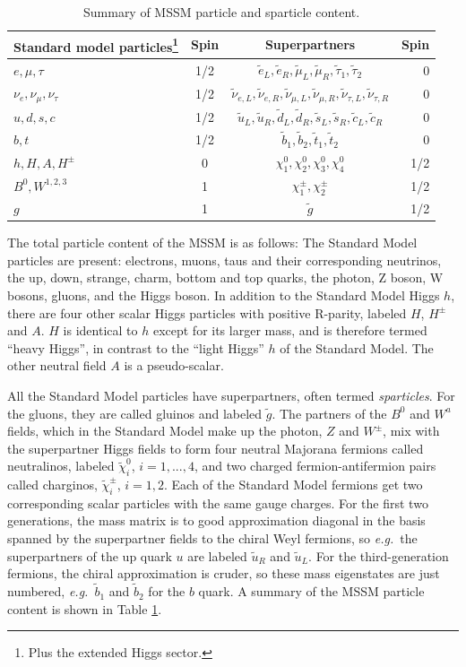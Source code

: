 \documentclass[twoside,english]{uiofysmaster}
\begin{document}
 \begin{table}[hbt]
 \centering
 	\begin{tabular}{l c  c  r}
 		Standard model particles\footnote{Plus the extended Higgs sector.} & Spin & Superpartners & Spin\\
 		\hline
    \hline
 		$e, \mu, \tau$ & 1/2 & $\tilde e_L, \tilde e_R, \tilde \mu_L, \tilde \mu_R, \tilde \tau_1, \tilde \tau_2$ & 0\\
 		\hline
 		$\nu_e, \nu_\mu, \nu_\tau$ & 1/2 & $\tilde \nu_{e,L}, \tilde \nu_{e,R}, \tilde \nu_{\mu,L}, \tilde \nu_{\mu,R}, \tilde \nu_{\tau,L}, \tilde \nu_{\tau,R}$ & 0\\
 		\hline
 		$u, d, s, c$ & 1/2 & $\tilde u_L, \tilde u_R, \tilde d_L, \tilde d_R, \tilde s_L, \tilde s_R, \tilde c_L, \tilde c_R$ & 0\\
 		\hline
 		$b, t$ & 1/2 & $\tilde b_1, \tilde b_2, \tilde t_1, \tilde t_2$ & 0\\
 		\hline
 		$h, H, A, H^\pm$ & 0 & $\chi_1^0, \chi_2^0, \chi_3^0, \chi_4^0$ & 1/2\\
 		$B^0, W^{1,2,3}$ & 1 & $\chi_1^\pm, \chi_2^\pm$ & 1/2\\
 		\hline
 		$g$ & 1 & $\tilde g$ & 1/2\\
    \hline
 	\end{tabular}
 	\caption{Summary of MSSM particle and sparticle content.}
 	\label{table:MSSM_particles}
 \end{table}
The total particle content of the MSSM is as follows: %
The Standard Model particles are present: electrons, muons, taus and their corresponding neutrinos, the up, down, strange, charm, bottom and top quarks, the photon, Z boson, W bosons, gluons, and the Higgs boson. In addition to the Standard Model Higgs $h$, there are four other scalar Higgs particles with positive R-parity, labeled $H$, $H^\pm$ and $A$. $H$ is identical to $h$ except for its larger mass, and is therefore termed ``heavy Higgs'', in contrast to the ``light Higgs'' $h$ of the Standard Model. The other neutral field $A$ is a pseudo-scalar.

All the Standard Model particles have superpartners, often termed {\it sparticles}. For the gluons, they are called gluinos and labeled $\tilde g$. The partners of the $B^0$ and $W^a$ fields, which in the Standard Model make up the photon, $Z$ and $W^\pm$, mix with the superpartner Higgs fields to form four neutral Majorana fermions called neutralinos, labeled $\tilde\chi_i^0$, $i=1,...,4$, and two charged fermion-antifermion pairs called charginos, $\tilde\chi_i^\pm$, $i=1,2$. Each of the Standard Model fermions get two corresponding scalar particles with the same gauge charges. For the first two generations, the mass matrix is to good approximation diagonal in the basis spanned by the superpartner fields to the chiral Weyl fermions, so {\it e.g.}\ the superpartners of the up quark $u$ are labeled $\tilde u_R$ and $\tilde u_L$. For the third-generation fermions, the chiral approximation is cruder, so these mass eigenstates are just numbered, {\it e.g.}\ $\tilde b_1$ and $\tilde b_2$ for the $b$ quark. A summary of the MSSM particle content is shown in Table \ref{table:MSSM_particles}.
\end{document}

